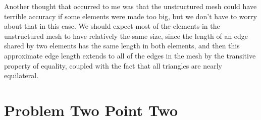 \documentclass[11pt]{article}
\begin{document}
\begin{enumerate}[(a)]
Another thought that occurred to me was that the unstructured mesh could have terrible accuracy if some elements were made too big, but we don't have to worry about that in this case. We should expect most of the elements in the unstructured mesh to have relatively the same size, since the length of an edge shared by two elements has the same length in both elements, and then this approximate  edge length extends to all of the edges in the mesh by the transitive property of equality, coupled with the fact that all triangles are nearly equilateral.
 
\end{enumerate}
\section*{Problem Two Point Two}
\end{document}
